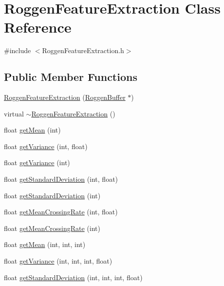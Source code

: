\hypertarget{classRoggenFeatureExtraction}{
\section{RoggenFeatureExtraction Class Reference}
\label{classRoggenFeatureExtraction}
}


{\ttfamily \#include $<$RoggenFeatureExtraction.h$>$}\subsection*{Public Member Functions}
\begin{DoxyCompactItemize}
\item 
\hyperlink{classRoggenFeatureExtraction_ae05e16461ab3f18d46b2600d755acf41}{RoggenFeatureExtraction} (\hyperlink{classRoggenBuffer}{RoggenBuffer} $\ast$)
\item 
virtual \hyperlink{classRoggenFeatureExtraction_a118897a7c8adfcc48e83fc6c856771c9}{$\sim$RoggenFeatureExtraction} ()
\item 
float \hyperlink{classRoggenFeatureExtraction_a72a3b28350c7742e030e630615572f4b}{getMean} (int)
\item 
float \hyperlink{classRoggenFeatureExtraction_af62cc552f9056669645aa1e14f05843d}{getVariance} (int, float)
\item 
float \hyperlink{classRoggenFeatureExtraction_af0aab8ee3b82d4d4e7f72901c87030e4}{getVariance} (int)
\item 
float \hyperlink{classRoggenFeatureExtraction_a2ed43ed995832b02eca20c700b26f5bc}{getStandardDeviation} (int, float)
\item 
float \hyperlink{classRoggenFeatureExtraction_abfa00feefa7124b6a8a9e20ca9b9c196}{getStandardDeviation} (int)
\item 
float \hyperlink{classRoggenFeatureExtraction_a731a33f8461bc0c4e0466ea628acf6ca}{getMeanCrossingRate} (int, float)
\item 
float \hyperlink{classRoggenFeatureExtraction_a19a17701ceaec1f656a6e3067bc364c7}{getMeanCrossingRate} (int)
\item 
float \hyperlink{classRoggenFeatureExtraction_a63dbff3c6517270dbea027ca4f47cb1c}{getMean} (int, int, int)
\item 
float \hyperlink{classRoggenFeatureExtraction_a6d66fc557929d6be589640e4f2325991}{getVariance} (int, int, int, float)
\item 
float \hyperlink{classRoggenFeatureExtraction_a6c9c0d0131731c4d2d7d0745a924c2bf}{getStandardDeviation} (int, int, int, float)

\end{DoxyCompactItemize}
